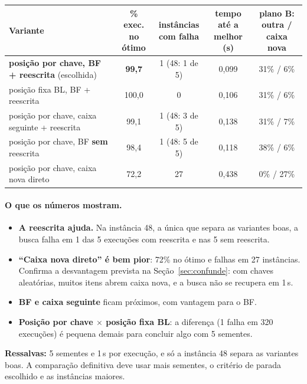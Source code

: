 \documentclass[11pt,a4paper]{article}
\begin{document}
\begin{center}\small
\begin{tabular}{@{}>{\raggedright\arraybackslash}p{5.6cm}cccc@{}}
\toprule
Variante & \makecell{\% exec.\\no ótimo} & \makecell{instâncias\\com falha} & \makecell{tempo até a\\melhor (s)} &
\makecell{plano B: outra /\\caixa nova} \\ \midrule
\textbf{posição por chave, BF + reescrita} (escolhida) & \textbf{99,7} & 1 (48: 1 de 5) & 0,099 & 31\% / 6\% \\
posição fixa BL, BF + reescrita & 100,0 & 0 & 0,106 & 31\% / 6\% \\
posição por chave, caixa seguinte + reescrita & 99,1 & 1 (48: 3 de 5) & 0,138 & 31\% / 7\% \\
posição por chave, BF \textbf{sem} reescrita & 98,4 & 1 (48: 5 de 5) & 0,118 & 38\% / 6\% \\
posição por chave, caixa nova direto & 72,2 & 27 & 0,438 & 0\% / 27\% \\
\bottomrule
\end{tabular}
\end{center}

\paragraph{O que os números mostram.}
\begin{itemize}[leftmargin=*,itemsep=2pt]
\item \textbf{A reescrita ajuda.} Na instância 48, a única que separa as variantes boas, a busca falha em 1 das 5
  execuções com reescrita e nas 5 sem reescrita.
\item \textbf{``Caixa nova direto'' é bem pior}: 72\% no ótimo e falhas em 27 instâncias. Confirma a desvantagem
  prevista na Seção~\ref{sec:confunde}: com chaves aleatórias, muitos itens abrem caixa nova, e a busca não se recupera
  em 1\,s.
\item \textbf{BF e caixa seguinte} ficam próximos, com vantagem para o BF.
\item \textbf{Posição por chave $\times$ posição fixa BL}: a diferença (1 falha em 320 execuções) é pequena demais para
  concluir algo com 5 sementes.
\end{itemize}
\textbf{Ressalvas:} 5 sementes e 1\,s por execução, e só a instância 48 separa as variantes boas. A comparação definitiva
deve usar mais sementes, o critério de parada escolhido e as instâncias maiores.
\end{document}
